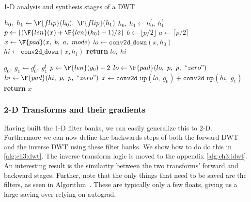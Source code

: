 \begin{algorithm}[tb]
\caption{1-D analysis and synthesis stages of a DWT}\label{alg:ch3:fb1d}
\begin{algorithmic}[1]
  \State $ h_0,\ h_1 \gets \F{flip}(h_0),\ \F{flip}(h_1) $
    \State $h_0,\ h_1 \gets h_0^t,\ h_1^t$  
  \EndIf
  \State $p \gets \lfloor (\F{len}(x) + \F{len}(h_0) - 1) / 2 \rfloor$ 
  \State $b \gets \lfloor p/2 \rfloor$ 
  \State $a \gets \lceil p/2 \rceil$ 
  \State $x \gets \F{pad}(x,\ b,\ a,\ mode)$  
  \State $lo \gets \mathtt{conv2d\_down} (x, h_0)$
  \State $hi \gets \mathtt{conv2d\_down} (x, h_1)$
  \State \textbf{return} $lo,\ hi$
\EndFunction
\end{algorithmic}\vspace{10pt}
\begin{algorithmic}[1]
    \State $g_0,\ g_1 \gets g_0^t,\ g_1^t$  
  \EndIf
  \State $p \gets \F{len}(g_0) - 2$ 
  \State $lo \gets \F{pad}(lo,\ p,\ p,\ ``zero")$  
  \State $hi \gets \F{pad}(hi,\ p,\ p,\ ``zero")$  
  \State $x \gets \mathtt{conv2d\_up}(lo,\ g_0) + \mathtt{conv2d\_up}(hi,\ g_1)$
  \State \textbf{return} $x$
\EndFunction
\end{algorithmic}
\end{algorithm}

\subsubsection{2-D Transforms and their gradients}
Having built the 1-D filter banks, we can easily generalize this to 2-D.
Furthermore we can now define the backwards steps of both the forward DWT
and the inverse DWT using these filter banks. We show how to do do this in 
\autoref{alg:ch3:dwt}. The inverse transform logic is moved to the appendix
\autoref{alg:ch3:idwt}. An interesting result is the similarity between the two 
transforms' forward and backward stages. Further, note that the only things that
need to be saved are the filters, as seen in
Algorithm~. These are typically only a
few floats, giving us a large saving over relying on autograd.

